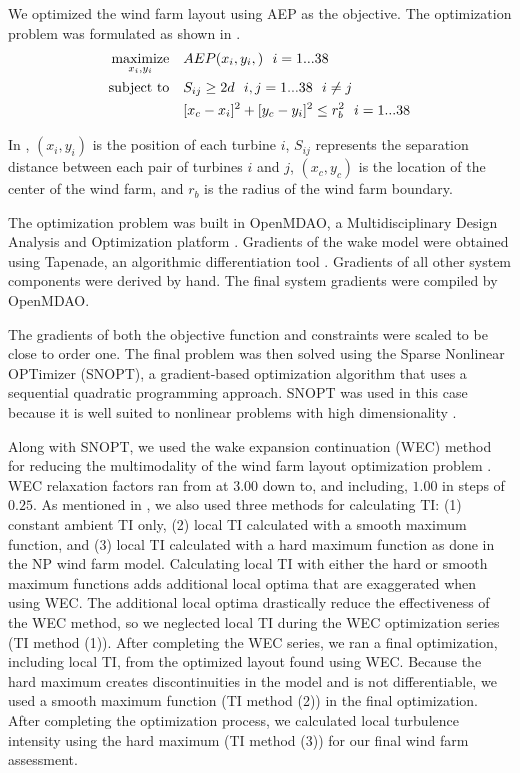 \documentclass[conf]{new-aiaa}
\begin{document}
We optimized the wind farm layout using AEP as the objective. The optimization problem was formulated as shown in .
%
\begin{equation}
	\label{eq:objective}
	\begin{aligned} [b]
	\underset{x_i,y_i}{\textrm{maximize}} \quad & AEP(x_i,y_i,)~~i=1...38\\
	\textrm{subject to} \quad & S_{ij} \geq 2\*d~~i,j=1...38~~i \neq j\\
	 & [x_c-x_i]^2+[y_c-y_i]^2 \leq r_{b}^2~~i=1...38\\
	\end{aligned}
\end{equation}
%
In , $(x_i,y_i)$ is the position of each turbine $i$, $S_{ij}$ represents the separation distance between each pair of turbines $i$ and $j$, $(x_c,y_c)$ is the location of the center of the wind farm, and $r_b$ is the radius of the wind farm boundary.

The optimization problem was built in OpenMDAO, a Multidisciplinary Design Analysis and Optimization platform  \cite{gray2010_OpenMDAO}. Gradients of the wake model were obtained using Tapenade, an algorithmic differentiation tool \cite{tapenade2013}. Gradients of all other system components were derived by hand. The final system gradients were compiled by OpenMDAO.

The gradients of both the objective function and constraints were scaled to be close to order one. The final problem was then solved using the Sparse Nonlinear OPTimizer (SNOPT), a gradient-based optimization algorithm that uses a sequential quadratic programming approach. SNOPT was used in this case because it is well suited to nonlinear problems with high dimensionality \cite{gill2005}. 

Along with SNOPT, we used the wake expansion continuation (WEC) method for reducing the multimodality of the wind farm layout optimization problem \cite{thomas2018-wec}. WEC relaxation factors ran from at $3.00$ down to, and including, $1.00$ in steps of $0.25$. As mentioned in , we also used three methods for calculating TI: (1) constant ambient TI only, (2) local TI calculated with a smooth maximum function, and (3) local TI calculated with a hard maximum function as done in the NP wind farm model. Calculating local TI with either the hard or smooth maximum functions adds additional local optima that are exaggerated when using WEC. The additional local optima drastically reduce the effectiveness of the WEC method, so we neglected local TI during the WEC optimization series (TI method (1)). After completing the WEC series, we ran a final optimization, including local TI, from the optimized layout found using WEC. Because the hard maximum creates discontinuities in the model and is not differentiable, we used a smooth maximum function (TI method (2)) in the final optimization. After completing the optimization process, we calculated local turbulence intensity using the hard maximum (TI method (3)) for our final wind farm assessment. 
\end{document}
